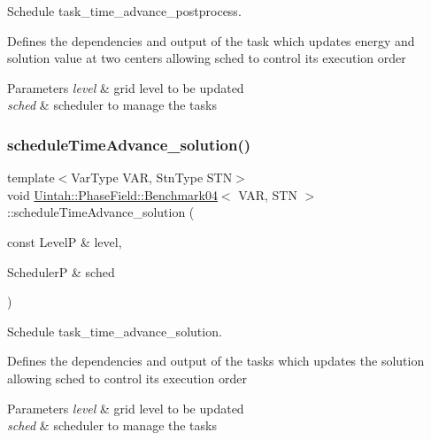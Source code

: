 Schedule task\+\_\+time\+\_\+advance\+\_\+postprocess. 

Defines the dependencies and output of the task which updates energy and solution value at two centers allowing sched to control its execution order


\begin{DoxyParams}{Parameters}
{\em level} & grid level to be updated \\
\hline
{\em sched} & scheduler to manage the tasks \\
\hline
\end{DoxyParams}
\mbox{\label{classUintah_1_1PhaseField_1_1Benchmark04_a1d0abfa4aa49476cb9b022bac5bff82a}} 
\subsubsection{\texorpdfstring{schedule\+Time\+Advance\+\_\+solution()}{scheduleTimeAdvance\_solution()}}
{\footnotesize\ttfamily template$<$Var\+Type V\+AR, Stn\+Type S\+TN$>$ \\
void \hyperlink{classUintah_1_1PhaseField_1_1Benchmark04}{Uintah\+::\+Phase\+Field\+::\+Benchmark04}$<$ V\+AR, S\+TN $>$\+::schedule\+Time\+Advance\+\_\+solution (\begin{DoxyParamCaption}\item[{const LevelP \&}]{level,  }\item[{SchedulerP \&}]{sched }\end{DoxyParamCaption})\hspace{0.3cm}{\ttfamily [protected]}}



Schedule task\+\_\+time\+\_\+advance\+\_\+solution. 

Defines the dependencies and output of the tasks which updates the solution allowing sched to control its execution order


\begin{DoxyParams}{Parameters}
{\em level} & grid level to be updated \\
\hline
{\em sched} & scheduler to manage the tasks \\
\hline
\end{DoxyParams}
\mbox{\label{classUintah_1_1PhaseField_1_1Benchmark04_a9c6ef6608cb97d1faacaa581fe75fc76}} 
